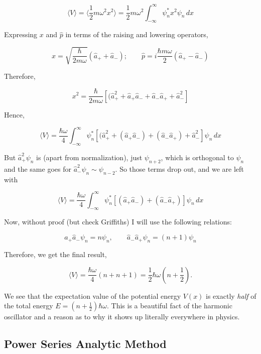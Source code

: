 \[
\langle V \rangle = \langle \frac{1}{2}m\omega^2 x^2\rangle
= \frac{1}{2}m\omega^2 \int_{-\infty}^{\infty} \psi_n^* x^2 \psi_n \, dx
\] \vspace{3px}

Expressing $x$ and $\hat{p}$ in terms of the raising and lowering operators, 

\[ \boxed{ x = \sqrt{\frac{\hbar}{2m\omega}} (\hat{a}_+ + \hat{a}_-); \qquad
\hat{p} = i\frac{\hbar m \omega}{2} (\hat{a}_+ - \hat{a}_-) } \]\vspace{3px}

Therefore, 

\[
x^2 = \frac{\hbar}{2m\omega} \left[ (\hat{a}_+^2 + \hat{a}_+\hat{a}_-
+ \hat{a}_-\hat{a}_+ + \hat{a}_-^2 \right] 
\] \vspace{3px}

Hence, 

\[
\langle V \rangle = \frac{\hbar\omega}{4}\int_{-\infty}^{\infty}  \psi_n^*
\left[ (\hat{a}_+^2 + (\hat{a}_+\hat{a}_-) + (\hat{a}_-\hat{a}_+)
+ \hat{a}_-^2\right] \psi_n \, dx
\] \vspace{3px}

But $\hat{a}_+^2\psi_n$ is (apart from normalization), just $\psi_{n+2}$, which
is orthogonal to $\psi_n$ and the same goes for $\hat{a}_-^2\psi_n \sim
\psi_{n-2}$. So those terms drop out, and we are left with 

\[
\langle V \rangle = \frac{\hbar\omega}{4}\int_{-\infty}^{\infty}  \psi_n^*
\left[ (\hat{a}_+\hat{a}_-) + (\hat{a}_-\hat{a}_+) \right] \psi_n \, dx
\] \vspace{3px}

Now, without proof (but check Griffiths) I will use the following relations: 

\[
\hat{a}_+\hat{a}_- \psi_n = n\psi_n, \qquad \hat{a}_-\hat{a}_+\psi_n
= (n+1)\psi_n
\] \vspace{3px}

Therefore, we get the final result, 

\[
\langle V \rangle = \frac{\hbar \omega}{4} (n + n + 1) = \frac{1}{2}\hbar\omega
(n + \frac{1}{2}). 
\] \vspace{3px}

We see that the expectation value of the potential energy $V(x)$ is exactly
\textit{half} of the total energy $E = \left(n+\frac{1}{2}\right)\hbar\omega$.
This is a beautiful fact of the harmonic oscillator and a reason as to why it
shows up literally everywhere in physics. 

\subsection{Power Series Analytic Method}

